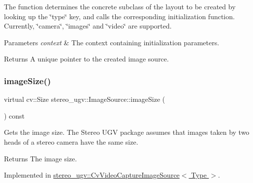 The function determines the concrete subclass of the layout to be created by looking up the \char`\"{}type\char`\"{} key, and calls the corresponding initialization function. Currently, \char`\"{}camera\char`\"{}, \char`\"{}images\char`\"{} and \char`\"{}video\char`\"{} are supported. 
\begin{DoxyParams}{Parameters}
{\em context} & The context containing initialization parameters. \\
\hline
\end{DoxyParams}
\begin{DoxyReturn}{Returns}
A unique pointer to the created image source. 
\end{DoxyReturn}
\mbox{\label{classstereo__ugv_1_1ImageSource_a30d9146abcdcef11f03685a9887b96d0}} 
\subsubsection{\texorpdfstring{image\+Size()}{imageSize()}}
{\footnotesize\ttfamily virtual cv\+::\+Size stereo\+\_\+ugv\+::\+Image\+Source\+::image\+Size (\begin{DoxyParamCaption}{ }\end{DoxyParamCaption}) const\hspace{0.3cm}{\ttfamily [pure virtual]}}



Gets the image size. The Stereo U\+GV package assumes that images taken by two heads of a stereo camera have the same size. 

\begin{DoxyReturn}{Returns}
The image size. 
\end{DoxyReturn}


Implemented in \hyperlink{classstereo__ugv_1_1CvVideoCaptureImageSource_a84dd7dbd0ff6091d68843ca02a18e0cc}{stereo\+\_\+ugv\+::\+Cv\+Video\+Capture\+Image\+Source$<$ Type $>$}.

\mbox{\label{classstereo__ugv_1_1ImageSource_a3d87f7b09cd8889fcbee3efb29a0c39c}} 
